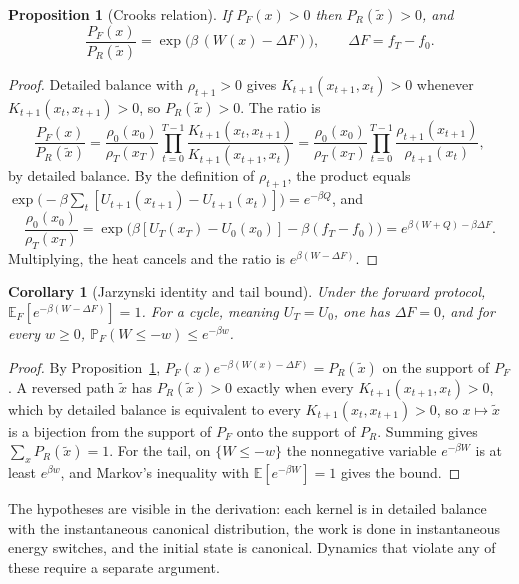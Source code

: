 \documentclass[11pt]{article}
\newtheorem{proposition}{Proposition}
\newtheorem{corollary}{Corollary}
\theoremstyle{definition}
\theoremstyle{remark}
\newcommand{\E}{\mathbb{E}}
\renewcommand{\Pr}{\mathbb{P}}
\begin{document}
\begin{proposition}[Crooks relation]\label{prop:crooksapp}
If $P_F(x) > 0$ then $P_R(\tilde{x}) > 0$, and
\[
\frac{P_F(x)}{P_R(\tilde{x})} = \exp\big(\beta\,(W(x) - \Delta F)\big), \qquad \Delta F = f_T - f_0 .
\]
\end{proposition}

\begin{proof}
Detailed balance with $\rho_{t+1} > 0$ gives $K_{t+1}(x_{t+1}, x_t) > 0$ whenever $K_{t+1}(x_t, x_{t+1}) > 0$, so $P_R(\tilde x) > 0$. The ratio is
\[
\frac{P_F(x)}{P_R(\tilde{x})} = \frac{\rho_0(x_0)}{\rho_T(x_T)} \prod_{t=0}^{T-1} \frac{K_{t+1}(x_t, x_{t+1})}{K_{t+1}(x_{t+1}, x_t)} = \frac{\rho_0(x_0)}{\rho_T(x_T)} \prod_{t=0}^{T-1} \frac{\rho_{t+1}(x_{t+1})}{\rho_{t+1}(x_t)},
\]
by detailed balance. By the definition of $\rho_{t+1}$, the product equals $\exp\big(-\beta \sum_t [U_{t+1}(x_{t+1}) - U_{t+1}(x_t)]\big) = e^{-\beta Q}$, and
\[
\frac{\rho_0(x_0)}{\rho_T(x_T)} = \exp\big(\beta [U_T(x_T) - U_0(x_0)] - \beta (f_T - f_0)\big) = e^{\beta (W + Q) - \beta \Delta F}.
\]
Multiplying, the heat cancels and the ratio is $e^{\beta (W - \Delta F)}$.
\end{proof}

\begin{corollary}[Jarzynski identity and tail bound]\label{cor:jarzapp}
Under the forward protocol, $\E_F[e^{-\beta (W - \Delta F)}] = 1$. For a cycle, meaning $U_T = U_0$, one has $\Delta F = 0$, and for every $w \ge 0$, $\Pr_F(W \le -w) \le e^{-\beta w}$.
\end{corollary}

\begin{proof}
By Proposition~\ref{prop:crooksapp}, $P_F(x) e^{-\beta (W(x) - \Delta F)} = P_R(\tilde{x})$ on the support of $P_F$. A reversed path $\tilde x$ has $P_R(\tilde x) > 0$ exactly when every $K_{t+1}(x_{t+1}, x_t) > 0$, which by detailed balance is equivalent to every $K_{t+1}(x_t, x_{t+1}) > 0$, so $x \mapsto \tilde{x}$ is a bijection from the support of $P_F$ onto the support of $P_R$. Summing gives $\sum_x P_R(\tilde x) = 1$. For the tail, on $\{W \le -w\}$ the nonnegative variable $e^{-\beta W}$ is at least $e^{\beta w}$, and Markov's inequality with $\E[e^{-\beta W}] = 1$ gives the bound.
\end{proof}

The hypotheses are visible in the derivation: each kernel is in detailed balance with the instantaneous canonical distribution, the work is done in instantaneous energy switches, and the initial state is canonical. Dynamics that violate any of these require a separate argument.
\end{document}
